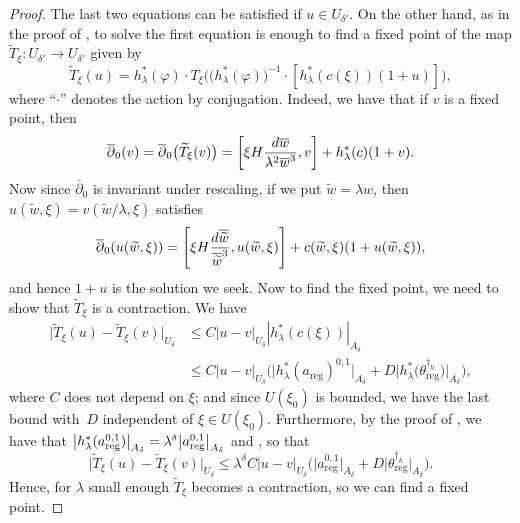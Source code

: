 \documentclass[11pt]{article}
\numberwithin{equation}{section}
\numberwithin{equation}{section}
\begin{document}
\begin{proof}
The last two equations can be satisfied if $u\in U_{\delta'}$. On the other hand, as in the proof of \cite[Lemma 7.1]{BB04}, to solve the first equation is enough to find a fixed point of the map $\widetilde{T}_{\xi}\colon U_{\delta'}\to U_{\delta'}$ given by
\begin{equation*}
 \widetilde{T}_{\xi}(u)=h^{*}_{\lambda}(\varphi)\cdot T_{\xi}\big(\big(h^{*}_{\lambda}(\varphi)\big)^{-1}\cdot[ h^{*}_{\lambda}(c(\xi))(1+u)]\big),
\end{equation*}
where ``$\cdot$'' denotes the action by conjugation. Indeed, we have that if $v$ is a fixed point, then
\begin{equation*}
 \begin{split}
 \overline{\partial}_0(v)=\overline{\partial}_0\bigl(\widetilde{T}_{\xi}(v)\bigr)=\left[\xi H \frac{{\rm d}\overline{w}}{\lambda^2\overline{w}^3},v\right]+h^*_{\lambda}(c)(1+v).
 \end{split}
\end{equation*}
Now since $\overline{\partial}_0$ is invariant under rescaling, if we put $\widetilde{w}=\lambda w$, then $u(\widetilde{w},\xi)=v(\widetilde{w}/\lambda,\xi)$ satisfies
\begin{equation*}
 \overline{\partial}_0(u(\widetilde{w},\xi))=\left[\xi H \frac{{\rm d}\overline{\widetilde{w}}}{\overline{\widetilde{w}}^3},u(\widetilde{w},\xi)\right]+c(\widetilde{w},\xi)(1+u(\widetilde{w},\xi)),
\end{equation*}
and hence $1+u$ is the solution we seek. Now to find the fixed point, we need to show that $\widetilde{T}_{\xi}$ is a contraction. We have
\begin{align*}
 \big|\widetilde{T}_{\xi}(u)-\widetilde{T}_{\xi}(v)\big|_{U_{\delta}}&\leq C|u-v|_{U_{\delta}}|h^*_{\lambda}(c(\xi))|_{A_{\delta}}\\
 &\leq C|u-v|_{U_{\delta}}\bigl(\big|h^*_{\lambda}(a_{\text{reg}})^{0,1}\big|_{A_{\delta}}+D\big|h^*_{\lambda}\bigl(\theta_{\text{reg}}^{\dagger_h}\bigr)\big|_{A_{\delta}}\bigr),
\end{align*}
where $C$ does not depend on $\xi$; and since $U(\xi_0)$ is bounded, we have the last bound with~$D$ independent of $\xi \in U(\xi_0)$. Furthermore, by the proof of \cite[Lemma 7.1]{BB04}, we have that $\smash{\big|h^*_{\lambda}(a_{\text{reg}}^{0,1})\big|_{A_{\delta}}}=\smash{\lambda^{\delta}\big|a_{\text{reg}}^{0,1}\big|_{A_{\delta}}}$ and , so that
\begin{equation*}
 \big|\widetilde{T}_{\xi}(u)-\widetilde{T}_{\xi}(v)\big|_{U_{\delta}}\leq \lambda^{\delta}C|u-v|_{U_{\delta}}\bigl(\big|a_{\text{reg}}^{0,1}\big|_{A_{\delta}}+D\big|\theta_{\text{reg}}^{\dagger_h}\big|_{A_{\delta}}\bigr).
\end{equation*}
Hence, for $\lambda$ small enough $\widetilde{T}_{\xi}$ becomes a contraction, so we can find a fixed point.


\end{proof}
\end{document}
